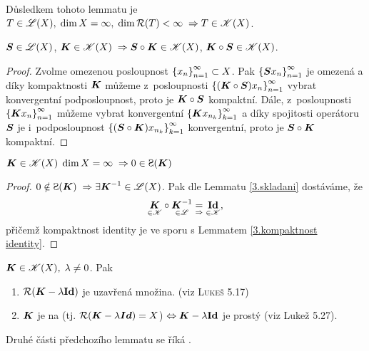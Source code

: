 Důsledkem tohoto lemmatu je $T\in\mathscr{L}(X),\;\dim X=\infty,\;\dim \mathcal{R}(T)<\infty\;\Rightarrow T\in\mathscr{K}(X)$.

\begin{lemma}\label{3.skladani}
$\boldsymbol{S} \in \mathscr{L} (X)$, $\boldsymbol{K} \in \mathscr{K}{(X)} \;\Rightarrow \boldsymbol{S} \circ \boldsymbol{K}\in\mathscr{K} {(X)}$, $\boldsymbol{K} \circ \boldsymbol{S}\in\mathscr{K}{(X)}$.
\end{lemma}

\begin{proof}
Zvolme omezenou posloupnost $\left \lbrace x_n \right \rbrace_{n=1}^\infty \subset X$. Pak $\left \lbrace \boldsymbol{S} x_n \right \rbrace_{n=1}^\infty$ je omezená a díky kompaktnosti $\boldsymbol{K}$ můžeme z~posloupnosti $\left \lbrace (\boldsymbol{K} \circ \boldsymbol{S}) x_n \right \rbrace_{n=1}^\infty$ vybrat konvergentní podposloupnost, proto je $\boldsymbol{K} \circ \boldsymbol{S}$ kompaktní. Dále, z~posloupnosti $\left \lbrace \boldsymbol{K} x_n \right \rbrace_{n=1}^\infty$ můžeme vybrat konvergentní $\left \lbrace \boldsymbol{K} x_{n_k} \right \rbrace_{k=1}^\infty$ a díky spojitosti operátoru $\boldsymbol{S}$ je i~podposloupnost $\left \lbrace (\boldsymbol{S} \circ \boldsymbol{K}) x_{n_k} \right \rbrace_{k=1}^\infty$ konvergentní, proto je $\boldsymbol{S} \circ \boldsymbol{K}$ kompaktní.

\end{proof}

\begin{lemma}%
$\map K\in\comp(X)\; \dim X=\infty \;\Rightarrow 0\in\Sp(\map K)$
\end{lemma}

\begin{proof}
$0\notin\Sp(\map K) \;\Rightarrow \exists \map K^{-1} \in \lin(X)$. Pak dle Lemmatu \ref{3.skladani} dostáváme, že 
$$\underset{\in \mathscr{K}}{\boldsymbol{K}} \circ \underset{\in \mathscr{L}}{\boldsymbol{K}^{-1}} \underset{\Rightarrow}{=} \underset{\in \mathscr{K}}{\boldsymbol{\mathrm{Id}}},$$
přičemž kompaktnost identity je ve sporu s Lemmatem \ref{3.kompaktnost identity}.
\end{proof}

\begin{lemma}%
$\boldsymbol{K} \in \mathscr{K}(X),\; \lambda \neq 0$. Pak 
\begin{enumerate}
    \item $\mathcal{R}(\boldsymbol{K} - \lambda \boldsymbol{\mathrm{Id}})$ je uzavřená množina. (viz \textsc{Lukeš 5.17})
    \item $\boldsymbol{K}$ je na (tj. $\mathcal{R}(\boldsymbol{K} - \lambda \boldsymbol{Id} )=X$) $\Leftrightarrow \boldsymbol{K} - \lambda \boldsymbol{\mathrm{Id}}$ je prostý (viz Lukež 5.27).
\end{enumerate}
\end{lemma}
\begin{remark}
Druhé části předchozího lemmatu se říká .
\end{remark}

